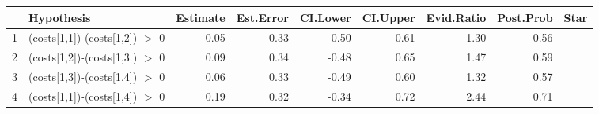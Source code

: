 \begin{table}[ht]
\centering
\begin{tabular}{rlrrrrrrl}
  \hline
 & Hypothesis & Estimate & Est.Error & CI.Lower & CI.Upper & Evid.Ratio & Post.Prob & Star \\ 
  \hline
1 & (costs[1,1])-(costs[1,2]) $>$ 0 & 0.05 & 0.33 & -0.50 & 0.61 & 1.30 & 0.56 &  \\ 
  2 & (costs[1,2])-(costs[1,3]) $>$ 0 & 0.09 & 0.34 & -0.48 & 0.65 & 1.47 & 0.59 &  \\ 
  3 & (costs[1,3])-(costs[1,4]) $>$ 0 & 0.06 & 0.33 & -0.49 & 0.60 & 1.32 & 0.57 &  \\ 
  4 & (costs[1,1])-(costs[1,4]) $>$ 0 & 0.19 & 0.32 & -0.34 & 0.72 & 2.44 & 0.71 &  \\ 
   \hline
\end{tabular}
\end{table}
